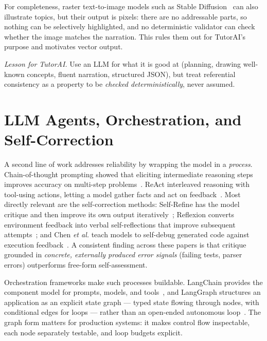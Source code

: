 For completeness, raster text-to-image models such as Stable
Diffusion~\cite{rombach2022stable} can also illustrate topics, but their
output is pixels: there are no addressable parts, so nothing can be
selectively highlighted, and no deterministic validator can check whether the
image matches the narration. This rules them out for TutorAI's purpose and
motivates vector output.

\emph{Lesson for TutorAI.} Use an LLM for what it is good at (planning,
drawing well-known concepts, fluent narration, structured JSON), but treat
referential consistency as a property to be \emph{checked deterministically},
never assumed.

\section{LLM Agents, Orchestration, and Self-Correction}

A second line of work addresses reliability by wrapping the model in a
\emph{process}. Chain-of-thought prompting showed that eliciting intermediate
reasoning steps improves accuracy on multi-step problems~\cite{wei2022cot}.
ReAct interleaved reasoning with tool-using actions, letting a model gather
facts and act on feedback~\cite{yao2023react}. Most directly relevant are the
self-correction methods: Self-Refine has the model critique and then improve
its own output iteratively~\cite{madaan2023selfrefine}; Reflexion converts
environment feedback into verbal self-reflections that improve subsequent
attempts~\cite{shinn2023reflexion}; and Chen \emph{et al.} teach models to
self-debug generated code against execution feedback~\cite{chen2023selfdebug}.
A consistent finding across these papers is that critique grounded in
\emph{concrete, externally produced error signals} (failing tests, parser
errors) outperforms free-form self-assessment.

Orchestration frameworks make such processes buildable. LangChain provides
the component model for prompts, models, and tools~\cite{langchain}, and
LangGraph structures an application as an explicit state graph --- typed
state flowing through nodes, with conditional edges for loops --- rather than
an open-ended autonomous loop~\cite{langgraph}. The graph form matters for
production systems: it makes control flow inspectable, each node separately
testable, and loop budgets explicit.

